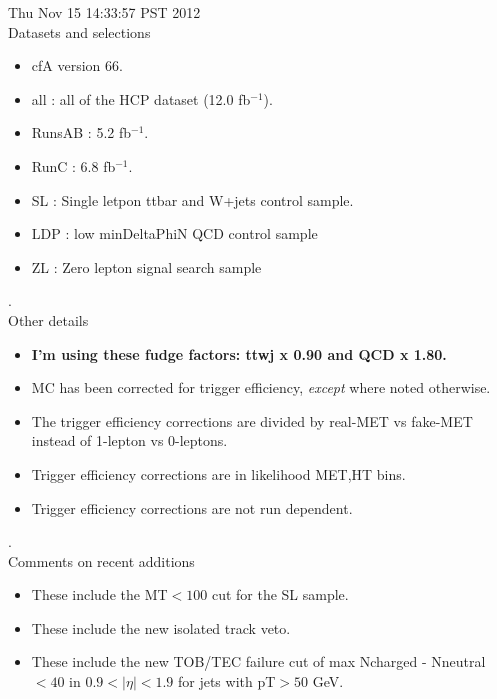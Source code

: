 \documentclass[11pt]{article}
\begin{document}
  Thu Nov 15 14:33:57 PST 2012 \\


   Datasets and selections
   \begin{itemize}
     \item cfA version 66.
     \item all : all of the HCP dataset (12.0 fb$^{-1}$).
     \item RunsAB : 5.2 fb$^{-1}$.
     \item RunC : 6.8 fb$^{-1}$.
     \item SL : Single letpon ttbar and W+jets control sample.
     \item LDP : low minDeltaPhiN QCD control sample
     \item ZL : Zero lepton signal search sample
   \end{itemize}

.\\

   Other details
   \begin{itemize}
     \item {\bf I'm using these fudge factors: ttwj x 0.90 and QCD x 1.80.}
     \item MC has been corrected for trigger efficiency, {\it except} where noted otherwise.
     \item  The trigger efficiency corrections are divided by real-MET vs fake-MET
             instead of 1-lepton vs 0-leptons.
     \item Trigger efficiency corrections are in likelihood MET,HT bins.
     \item Trigger efficiency corrections are not run dependent.
   \end{itemize}

.\\

  Comments on recent additions
  \begin{itemize}
     \item These include the MT$<100$ cut for the SL sample.
     \item These include the new isolated track veto.
     \item These include the new TOB/TEC failure cut of max Ncharged - Nneutral $<40$ in $0.9<|\eta|<1.9$ for
             jets with pT$>50$ GeV.
   \end{itemize}


  \pagebreak
  \clearpage
  \tableofcontents
  \clearpage


\end{document}
